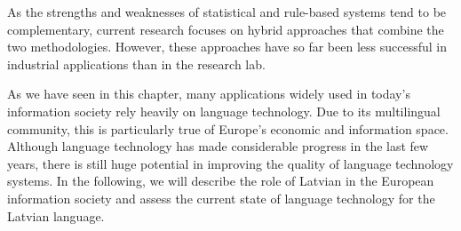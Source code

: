 \begin{multicols}{2}
As the strengths and weaknesses of statistical and rule-based systems tend to be complementary, current research focuses on hybrid approaches that combine the two methodologies.
However, these approaches have so far been less successful in industrial applications than in the research lab. 

As we have seen in this chapter, many applications widely used in today's information society rely heavily on language technology.
Due to its multilingual community, this is particularly true of Europe's economic and information space.
Although language technology has made considerable progress in the last few years, there is still huge potential in improving the quality of language technology systems.
In the following, we will describe the role of Latvian in the European information society and assess the current state of language technology for the Latvian language.

\end{multicols}

\clearpage


